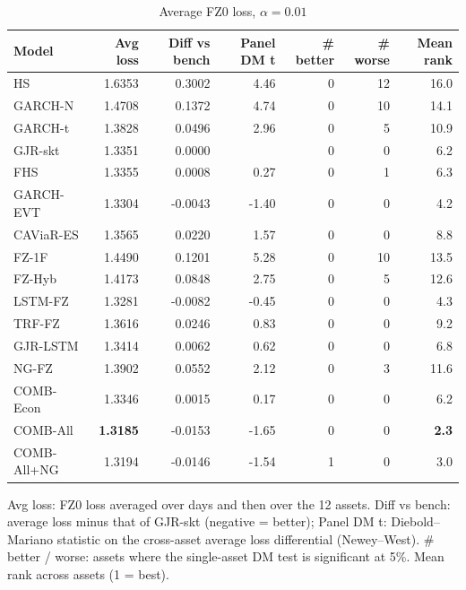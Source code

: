 \begin{table}[htbp]
\centering
\footnotesize
\caption{Average FZ0 loss, $\alpha=0.01$}
\label{tab:loss_a010}
\begin{tabular}{lrrrrrr}
\toprule
Model & Avg loss & Diff vs bench & Panel DM t & \# better & \# worse & Mean rank \\
\midrule
HS & 1.6353 & 0.3002 & 4.46 & 0 & 12 & 16.0 \\
GARCH-N & 1.4708 & 0.1372 & 4.74 & 0 & 10 & 14.1 \\
GARCH-t & 1.3828 & 0.0496 & 2.96 & 0 & 5 & 10.9 \\
GJR-skt & 1.3351 & 0.0000 &  & 0 & 0 & 6.2 \\
FHS & 1.3355 & 0.0008 & 0.27 & 0 & 1 & 6.3 \\
GARCH-EVT & 1.3304 & -0.0043 & -1.40 & 0 & 0 & 4.2 \\
CAViaR-ES & 1.3565 & 0.0220 & 1.57 & 0 & 0 & 8.8 \\
FZ-1F & 1.4490 & 0.1201 & 5.28 & 0 & 10 & 13.5 \\
FZ-Hyb & 1.4173 & 0.0848 & 2.75 & 0 & 5 & 12.6 \\
LSTM-FZ & 1.3281 & -0.0082 & -0.45 & 0 & 0 & 4.3 \\
TRF-FZ & 1.3616 & 0.0246 & 0.83 & 0 & 0 & 9.2 \\
GJR-LSTM & 1.3414 & 0.0062 & 0.62 & 0 & 0 & 6.8 \\
NG-FZ & 1.3902 & 0.0552 & 2.12 & 0 & 3 & 11.6 \\
COMB-Econ & 1.3346 & 0.0015 & 0.17 & 0 & 0 & 6.2 \\
COMB-All & \textbf{1.3185} & -0.0153 & -1.65 & 0 & 0 & \textbf{2.3} \\
COMB-All+NG & 1.3194 & -0.0146 & -1.54 & 1 & 0 & 3.0 \\
\bottomrule
\end{tabular}
\par\smallskip\parbox{\linewidth}{\scriptsize Avg loss: FZ0 loss averaged over days and then over the 12 assets. Diff vs bench: average loss minus that of GJR-skt (negative = better); Panel DM t: Diebold--Mariano statistic on the cross-asset average loss differential (Newey--West). \# better / worse: assets where the single-asset DM test is significant at 5\%. Mean rank across assets (1 = best).}
\end{table}